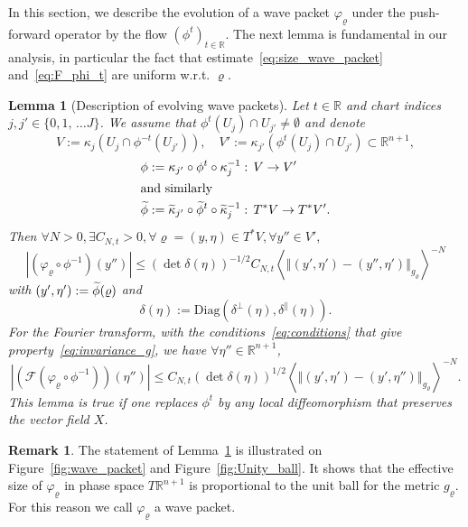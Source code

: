 \documentclass[10pt]{amsart}
\newtheorem{lemm}[theo]{Lemma}\newtheorem{prop}[theo]{Proposition}\newtheorem{coro}[theo]{Corollary}\newtheorem{conj}[theo]{Conjecture}
\theoremstyle{definition}\newtheorem{defi}[theo]{Definition}\newtheorem{rema}[theo]{Remark}\newtheorem{exam}[theo]{Example}\newtheorem{exem}[theo]{Example}\newtheorem{nota}[theo]{Notation}
\newcommand{\clF}{\mathcal{F}}
\newcommand{\Diag}{\mathrm{Diag}}
\newcommand{\bbR}{\mathbb{R}}
\let\oldtilde\tilde
\renewcommand*{\tilde}[1]{\mathchoice{\widetilde{#1}}{\widetilde{#1}}{\oldtilde{#1}}{\oldtilde{#1}}}
\let\oldexists\exists
\renewcommand*{\exists}{\mathrel{\oldexists}}
\let\oldforall\forall
\renewcommand*{\forall}{\mathrel{\oldforall}}
\begin{document}
In this section, we describe the evolution of a wave packet $\varphi_{\varrho}$ under the push-forward operator by the flow $(\phi^{t})_{t\in\bbR}$. The next lemma is fundamental in our analysis, in particular the fact that estimate~\eqref{eq:size_wave_packet} and~\eqref{eq:F_phi_t} are uniform w.r.t. $\varrho$.
\begin{tcolorbox}[enhanced, frame style={teal!80}, interior style={cyan!0},breakable]
\begin{lemm}[{Description of evolving wave packets}]
\label{lem:Description-of-evolving}
Let $t\in\bbR$ and chart indices $j,j'\in\{ 0,1,\,\ldots J\} $. We assume that $\phi^{t}(U_{j})\cap U_{j'}\neq\emptyset$ and denote
\[
V:=\kappa_{j}\left(U_{j}\cap\phi^{-t}\left(U_{j'}\right)\right),\quad V':=\kappa_{j'}\left(\phi^{t}\left(U_{j}\right)\cap U_{j'}\right)\subset\bbR^{n+1},
\]
\begin{align*}
\phi:=\kappa_{j'}\circ\phi^{t}\circ\kappa_{j}^{-1} &:\,V\rightarrow V'
\\
\intertext{and similarly}
\tilde{\phi}:=\tilde{\kappa}_{j'}\circ\tilde{\phi}^{t}\circ\tilde{\kappa}_{j}^{-1} &: \,T^{*}V\rightarrow T^{*}V'.
\end{align*}
Then $\forall N>0,\exists C_{N,t}>0,\forall\varrho=(y,\eta)\in T^{*}V,\forall y''\in V',$
\begin{equation}\label{eq:size_wave_packet}
\left|\left(\varphi_{\varrho}\circ\phi^{-1}\right)\left(y''\right)\right|\leq\left(\det \delta\left(\eta\right)\right)^{-1/2}C_{N,t}\left\langle \left\Vert \left(y',\eta'\right)-\left(y'',\eta'\right)\right\Vert _{g_{\varrho}}\right\rangle ^{-N}
\end{equation}
with $(y',\eta'):=\tilde{\phi}(\varrho)$ and
\[
\delta\left(\eta\right):=\Diag\left(\delta^{\perp}\left(\eta\right),\delta^{\parallel}\left(\eta\right)\right).
\]
For the Fourier transform, with the conditions~\eqref{eq:conditions} that give property~\eqref{eq:invariance_g}, we have $\forall\eta''\in\bbR^{n+1}$,
\begin{equation}
\left|\left(\clF\left(\varphi_{\varrho}\circ\phi^{-1}\right)\right)\left(\eta''\right)\right|\leq C_{N,t}\left(\det \delta\left(\eta\right)\right)^{1/2}\left\langle \left\Vert \left(y',\eta'\right)-\left(y',\eta''\right)\right\Vert _{g_{\varrho}}\right\rangle ^{-N}.\label{eq:F_phi_t}
\end{equation}
This lemma is true if one replaces $\phi^{t}$ by any local diffeomorphism that preserves the vector field $X$.
\end{lemm}
\end{tcolorbox}
\begin{rema}
The statement of Lemma~\ref{lem:Description-of-evolving} is illustrated on Figure~\ref{fig:wave_packet} and Figure~\ref{fig:Unity_ball}. It shows that the effective size of $\varphi_{\varrho}$ in phase space $T\bbR^{n+1}$ is proportional to the unit ball for the metric $g_{\varrho}$. For this reason we call $\varphi_{\varrho}$ a wave packet.
\end{rema}
\end{document}
